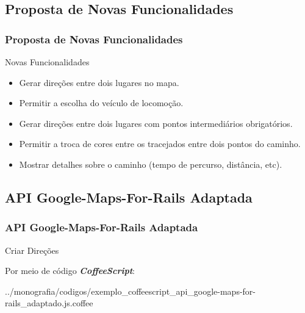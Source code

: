  \subsection{Proposta de Novas Funcionalidades}
\begin{frame}
 \frametitle{Proposta de Novas Funcionalidades}

  \begin{block}{Novas Funcionalidades}   

   \begin{itemize}

    \item  Gerar direções entre dois lugares no mapa.

    \item  Permitir a escolha do veículo de locomoção.

    \item  Gerar direções entre dois lugares com pontos intermediários obrigatórios.

    \item  Permitir a troca de cores entre os tracejados entre dois pontos do caminho.
    
    \item  Mostrar detalhes sobre o caminho (tempo de percurso, distância, etc).

   \end{itemize}

  \end{block}

\end{frame}


\subsection{API Google-Maps-For-Rails Adaptada}
\begin{frame}
 \frametitle{API Google-Maps-For-Rails Adaptada}

  \begin{block}{Criar Direções}

   Por meio de código \emph{\textbf{CoffeeScript}}:

      
      {../monografia/codigos/exemplo_coffeescript_api_google-maps-for-rails_adaptado.js.coffee}

  \end{block}

\end{frame}
